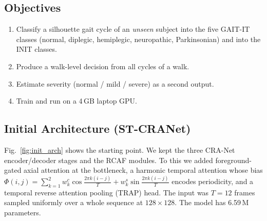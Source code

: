 \documentclass[conference]{IEEEtran}
\begin{document}
\subsection{Objectives}
\begin{enumerate}
\item Classify a silhouette gait cycle of an \emph{unseen} subject into the
five GAIT-IT classes (normal, diplegic, hemiplegic, neuropathic, Parkinsonian)
and into the INIT classes.
\item Produce a walk-level decision from all cycles of a walk.
\item Estimate severity (normal / mild / severe) as a second output.
\item Train and run on a 4\,GB laptop GPU.
\end{enumerate}

\subsection{Initial Architecture (ST-CRANet)}
Fig.~\ref{fig:init_arch} shows the starting point. We kept the three CRA-Net
encoder/decoder stages and the RCAF modules. To this we added foreground-gated
axial attention at the bottleneck, a harmonic temporal attention whose bias
$\Phi(i,j)=\sum_{k=1}^{2}w^c_k\cos\tfrac{2\pi k(i-j)}{T}+w^s_k\sin\tfrac{2\pi
k(i-j)}{T}$ encodes periodicity, and a temporal reverse attention pooling (TRAP)
head. The input was $T=12$ frames sampled uniformly over a whole sequence at
$128\times128$. The model has 6.59\,M parameters.
\end{document}
